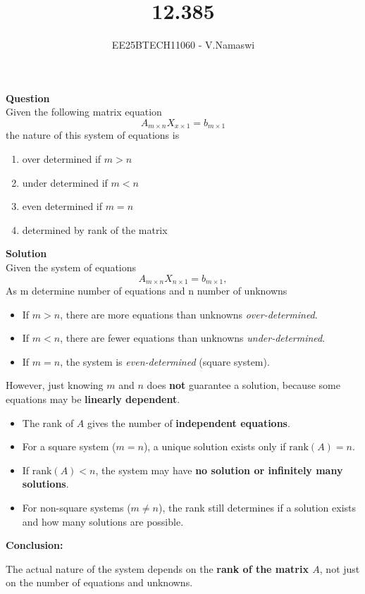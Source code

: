 \documentclass[journal]{IEEEtran}
\begin{document}

\vspace{3cm}

\title{12.385}
\author{EE25BTECH11060 - V.Namaswi}
{\let\newpage\relax\maketitle}
\renewcommand{\thefigure}{\theenumi}
\renewcommand{\thetable}{\theenumi}
\setlength{\intextsep}{10pt} %
\textbf{Question}\\
Given the following matrix equation 
 \[
A_{m \times n} X_{x \times 1} = b_{m \times 1}
\]  the nature of this system of equations is \\
\begin{multicols}{2}
    \begin{enumerate}
\item  over determined if $m>n$
 \item  under determined if $m<n$
 \item  even determined if $m=n$
 \item  determined by rank of the matrix 
    \end{enumerate}
\end{multicols}
\textbf{Solution}\\
Given the system of equations 
\[
A_{m \times n} X_{n \times 1} = b_{m \times 1},
\] 
As m determine number of equations and n number of unknowns\\ 
  
\begin{itemize}
    \item If $m > n$, there are more equations than unknowns   \textit{over-determined}.
    \item If $m < n$, there are fewer equations than unknowns   \textit{under-determined}.
    \item If $m = n$, the system is \textit{even-determined} (square system).
    \end{itemize}
However, just knowing $m$ and $n$ does \textbf{not} guarantee a solution, because some equations may be \textbf{linearly dependent}.

\begin{itemize}
    \item The rank of $A$ gives the number of \textbf{independent equations}.
    \item For a square system ($m=n$), a unique solution exists only if $\text{rank}(A) = n$.
    \item If $\text{rank}(A) < n$, the system may have \textbf{no solution or infinitely many solutions}.
    \item For non-square systems ($m \neq n$), the rank still determines if a solution exists and how many solutions are possible.
\end{itemize}

\textbf{Conclusion:}  

The actual nature of the system depends on the \textbf{rank of the matrix $A$}, not just on the number of equations and unknowns.  
\end{document}
